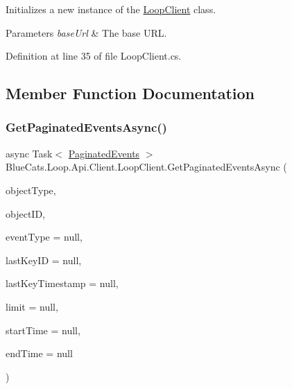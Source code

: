 Initializes a new instance of the \mbox{\hyperlink{class_blue_cats_1_1_loop_1_1_api_1_1_client_1_1_loop_client}{Loop\+Client}} class. 


\begin{DoxyParams}{Parameters}
{\em base\+Url} & The base U\+RL.\\
\hline
\end{DoxyParams}


Definition at line 35 of file Loop\+Client.\+cs.



\subsection{Member Function Documentation}
\mbox{\label{class_blue_cats_1_1_loop_1_1_api_1_1_client_1_1_loop_client_a405d05d5f9109565cc7657f64fe1e6ef}} 
\subsubsection{\texorpdfstring{Get\+Paginated\+Events\+Async()}{GetPaginatedEventsAsync()}}
{\footnotesize\ttfamily async Task$<$ \mbox{\hyperlink{class_blue_cats_1_1_loop_1_1_api_1_1_client_1_1_models_1_1_paginated_events}{Paginated\+Events}} $>$ Blue\+Cats.\+Loop.\+Api.\+Client.\+Loop\+Client.\+Get\+Paginated\+Events\+Async (\begin{DoxyParamCaption}\item[{string}]{object\+Type,  }\item[{string}]{object\+ID,  }\item[{string}]{event\+Type = {\ttfamily null},  }\item[{string}]{last\+Key\+ID = {\ttfamily null},  }\item[{Date\+Time?}]{last\+Key\+Timestamp = {\ttfamily null},  }\item[{int?}]{limit = {\ttfamily null},  }\item[{Date\+Time?}]{start\+Time = {\ttfamily null},  }\item[{Date\+Time?}]{end\+Time = {\ttfamily null} }\end{DoxyParamCaption})\hspace{0.3cm}{\ttfamily [inline]}}



